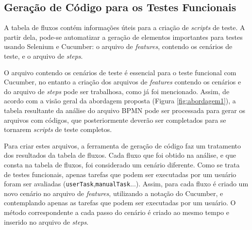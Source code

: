 \documentclass[12pt]{article}
\begin{document}




\subsection{Geração de Código para os Testes Funcionais}

A tabela de fluxos contém informações úteis para a criação de \emph{scripts} de teste. A partir dela, pode-se automatizar a geração de elementos importantes para testes usando Selenium e Cucumber: o arquivo de \emph{features},  contendo os cenários de teste, e o arquivo de \emph{steps}.


O arquivo contendo os cenários de teste é essencial para o teste funcional com Cucumber, no entanto a criação dos arquivos de \emph{features} contendo os cenários e do arquivo de \emph{steps} pode ser trabalhosa, como já foi mencionado. Assim, de acordo com a visão geral da abordagem proposta (Figura \ref{fig:abordagem1}), a tabela resultante da análise do arquivo BPMN pode ser processada para gerar os arquivos com códigos, que posteriormente deverão ser completados para se tornarem \emph{scripts} de teste completos. 

Para criar estes arquivos, a ferramenta de geração de código faz um tratamento dos resultados da tabela de fluxos. Cada fluxo que foi obtido na análise, e que consta na tabela de fluxos, foi considerado um cenário diferente. Como se trata de testes funcionais, apenas tarefas que podem ser executadas por um usuário foram ser avaliadas (\texttt{userTask},\texttt{manualTask}...). Assim, para cada fluxo é criado um novo cenário no arquivo de \emph{features}, utilizando a notação do Cucumber, e contemplando apenas as tarefas que podem ser executadas por um usuário. O método correspondente a cada passo do cenário é criado ao mesmo tempo e inserido no arquivo de \emph{steps}. %
\end{document}
